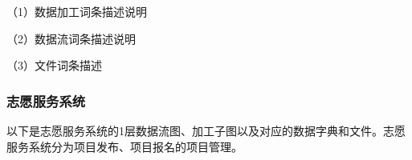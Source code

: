 \begin{figure}[H]
    \label{0level_data}
    \end{figure}
    
（1）数据加工词条描述说明


（2）数据流词条描述说明


（3）文件词条描述


\subsubsection{志愿服务系统}
以下是志愿服务系统的1层数据流图、加工子图以及对应的数据字典和文件。志愿服务系统分为项目发布、项目报名的项目管理。

